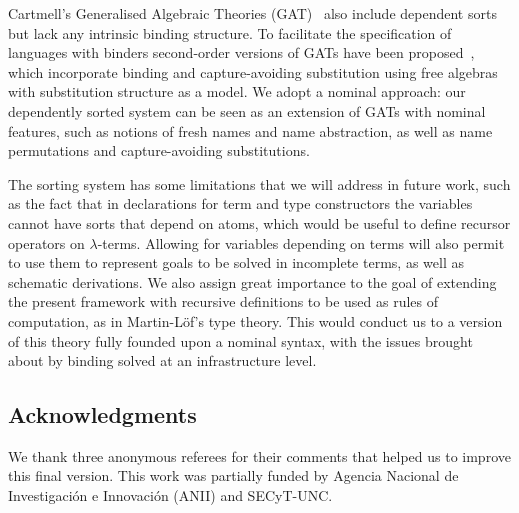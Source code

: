 \documentclass[11pt,a4paper]{amsart}
\newcounter{s}
\begin{document}
Cartmell's Generalised Algebraic Theories (GAT)~\cite{Cartmell86,SterlingJ:algttu} also include dependent sorts but lack any intrinsic binding structure. 
To facilitate the specification of languages with binders  second-order versions of GATs have been proposed~\cite{Fiore08,UemuraPhD,KaposiX24}, which incorporate binding and capture-avoiding substitution using free algebras with substitution structure as a model. We adopt a nominal approach: our dependently sorted system can be seen as an extension of GATs with nominal features, such as notions of fresh names and name abstraction, as well as name permutations and capture-avoiding substitutions. 

The sorting system has some limitations that we will address in future work, such as the fact that in declarations for term and type constructors the variables cannot have sorts that depend on atoms, which would be useful to define recursor operators  on $\lambda$-terms. Allowing for variables depending on terms will also permit to use them to 
represent goals to be solved in incomplete terms, as well as schematic derivations.
We also assign great importance to the goal of extending the present framework with recursive definitions to be used as rules of computation, as in Martin-L\"of's type theory. This would conduct us to a version of this theory fully founded upon a nominal syntax, with the issues brought about by binding solved at an infrastructure level.

\subsection*{Acknowledgments} We thank three anonymous referees for their
comments that helped us to improve this final version. This work was partially
funded by Agencia Nacional de Investigación e Innovación (ANII) and SECyT-UNC.

\end{document}
